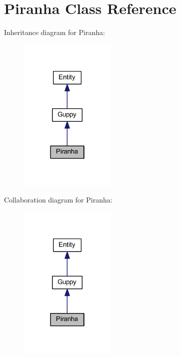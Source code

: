 \hypertarget{class_piranha}{}\section{Piranha Class Reference}
\label{class_piranha}


Inheritance diagram for Piranha\+:
\nopagebreak
\begin{figure}[H]
\begin{center}
\leavevmode
\includegraphics[width=130pt]{class_piranha__inherit__graph}
\end{center}
\end{figure}


Collaboration diagram for Piranha\+:
\nopagebreak
\begin{figure}[H]
\begin{center}
\leavevmode
\includegraphics[width=130pt]{class_piranha__coll__graph}
\end{center}
\end{figure}

